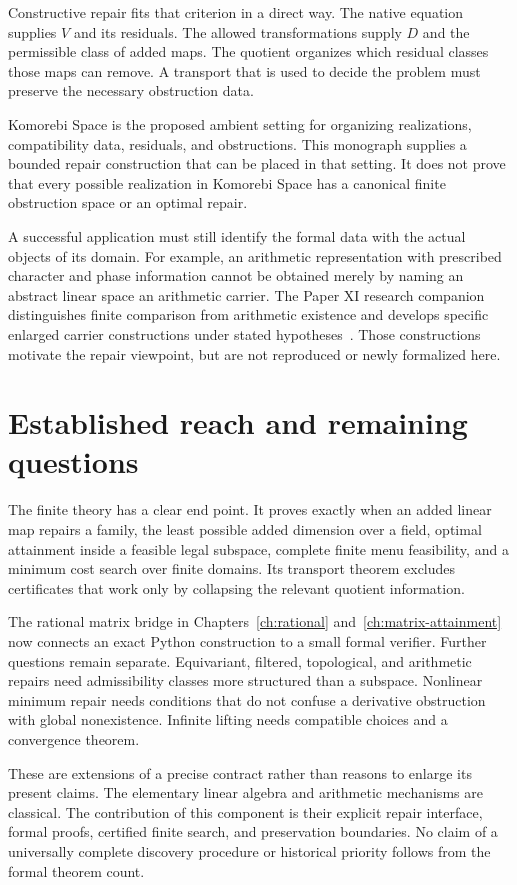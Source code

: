 \documentclass[11pt,letterpaper,oneside,openany]{book}
\theoremstyle{quiet}
\begin{document}
Constructive repair fits that criterion in a direct way. The native equation supplies $V$ and its residuals. The allowed transformations supply $D$ and the permissible class of added maps. The quotient organizes which residual classes those maps can remove. A transport that is used to decide the problem must preserve the necessary obstruction data.

Komorebi Space is the proposed ambient setting for organizing realizations, compatibility data, residuals, and obstructions. This monograph supplies a bounded repair construction that can be placed in that setting. It does not prove that every possible realization in Komorebi Space has a canonical finite obstruction space or an optimal repair.

A successful application must still identify the formal data with the actual objects of its domain. For example, an arithmetic representation with prescribed character and phase information cannot be obtained merely by naming an abstract linear space an arithmetic carrier. The Paper XI research companion distinguishes finite comparison from arithmetic existence and develops specific enlarged carrier constructions under stated hypotheses~\cite{paperxi}. Those constructions motivate the repair viewpoint, but are not reproduced or newly formalized here.

\section{Established reach and remaining questions}
The finite theory has a clear end point. It proves exactly when an added linear map repairs a family, the least possible added dimension over a field, optimal attainment inside a feasible legal subspace, complete finite menu feasibility, and a minimum cost search over finite domains. Its transport theorem excludes certificates that work only by collapsing the relevant quotient information.

The rational matrix bridge in Chapters~\ref{ch:rational} and~\ref{ch:matrix-attainment} now connects an exact Python construction to a small formal verifier. Further questions remain separate. Equivariant, filtered, topological, and arithmetic repairs need admissibility classes more structured than a subspace. Nonlinear minimum repair needs conditions that do not confuse a derivative obstruction with global nonexistence. Infinite lifting needs compatible choices and a convergence theorem.

These are extensions of a precise contract rather than reasons to enlarge its present claims. The elementary linear algebra and arithmetic mechanisms are classical. The contribution of this component is their explicit repair interface, formal proofs, certified finite search, and preservation boundaries. No claim of a universally complete discovery procedure or historical priority follows from the formal theorem count.
\end{document}
